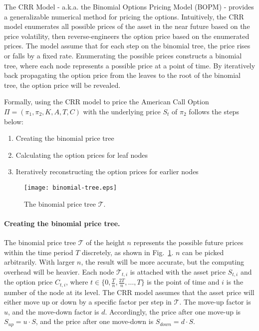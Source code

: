 The CRR Model - a.k.a. the Binomial Options Pricing Model (BOPM) - provides a generalizable numerical method for pricing the options.
Intuitively, the CRR model enumerates all possible prices of the asset in the near future based on the price volatility,
then reverse-engineers the option price based on the enumerated prices.
The model assume that for each step on the binomial tree, the price rises or falls by a fixed rate.
Enumerating the possible prices constructs a binomial tree, where each node represents a possible price at a point of time.
By iteratively back propagating the option price from the leaves to the root of the binomial tree, the option price will be revealed.

Formally, using the CRR model to price the American Call Option $\Pi = (\pi_1, \pi_2, K, A, T, C)$ with the underlying price $S_t$ of $\pi_2$ follows the steps below:

\begin{enumerate}
    \item Creating the binomial price tree
    \item Calculating the option prices for leaf nodes
    \item Iteratively reconstructing the option prices for earlier nodes 
\end{enumerate}


\begin{figure}
    \centering
    \texttt{[image: binomial-tree.eps]}
    \caption{The binomial price tree $\mathcal{T}$.}
    \label{fig:binomial_tree}
\end{figure}

\paragraph{Creating the binomial price tree.}
The binomial price tree $\mathcal{T}$ of the height $n$ represents the possible future prices within the time period $T$ discretely, as shown in Fig.~\ref{fig:binomial_tree}.
$n$ can be picked arbitrarily. With larger $n$, the result will be more accurate, but the computing overhead will be heavier.
Each node $\mathcal{T}_{t, i}$ is attached with the asset price $S_{t, i}$ and the option price $C_{t, i}$,
where $t \in \{0, \frac{T}{n}, \frac{2T}{n}, \dots, T\}$ is the point of time and $i$ is the number of the node at its level.
The CRR model assumes that the asset price will either move up or down by a specific factor per step in $\mathcal{T}$.
The move-up factor is $u$, and the move-down factor is $d$.
Accordingly, the price after one move-up is $S_{up} = u \cdot S$, and the price after one move-down is $S_{down} = d \cdot S$.

